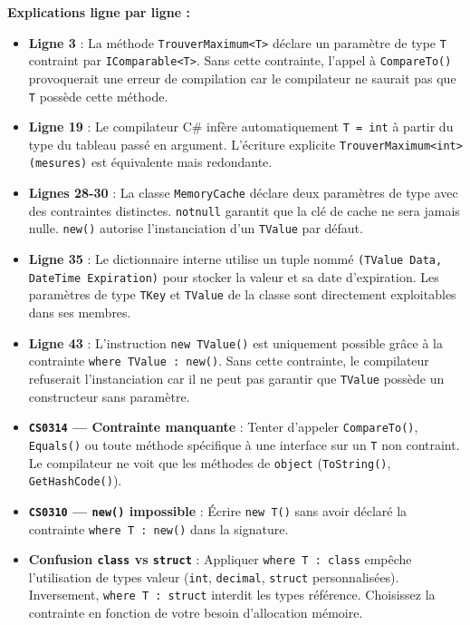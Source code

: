 \textbf{Explications ligne par ligne :}
\begin{itemize}
    \item \textbf{Ligne 3} : La méthode \texttt{TrouverMaximum<T>} déclare un paramètre de type \texttt{T} contraint par \texttt{IComparable<T>}. Sans cette contrainte, l'appel à \texttt{CompareTo()} provoquerait une erreur de compilation car le compilateur ne saurait pas que \texttt{T} possède cette méthode.
    \item \textbf{Ligne 19} : Le compilateur C\# infère automatiquement \texttt{T = int} à partir du type du tableau passé en argument. L'écriture explicite \texttt{TrouverMaximum<int>(mesures)} est équivalente mais redondante.
    \item \textbf{Lignes 28-30} : La classe \texttt{MemoryCache} déclare deux paramètres de type avec des contraintes distinctes. \texttt{notnull} garantit que la clé de cache ne sera jamais nulle. \texttt{new()} autorise l'instanciation d'un \texttt{TValue} par défaut.
    \item \textbf{Ligne 35} : Le dictionnaire interne utilise un tuple nommé \texttt{(TValue Data, DateTime Expiration)} pour stocker la valeur et sa date d'expiration. Les paramètres de type \texttt{TKey} et \texttt{TValue} de la classe sont directement exploitables dans ses membres.
    \item \textbf{Ligne 43} : L'instruction \texttt{new TValue()} est uniquement possible grâce à la contrainte \texttt{where TValue : new()}. Sans cette contrainte, le compilateur refuserait l'instanciation car il ne peut pas garantir que \texttt{TValue} possède un constructeur sans paramètre.
\end{itemize}

\begin{tcolorbox}[colback=white,colframe=keywordcolor,title=\textbf{Pièges courants \& Erreurs de compilation}]
    \begin{itemize}
        \item \textbf{\texttt{CS0314} — Contrainte manquante} : Tenter d'appeler \texttt{CompareTo()}, \texttt{Equals()} ou toute méthode spécifique à une interface sur un \texttt{T} non contraint. Le compilateur ne voit que les méthodes de \texttt{object} (\texttt{ToString()}, \texttt{GetHashCode()}).
        \item \textbf{\texttt{CS0310} — \texttt{new()} impossible} : Écrire \texttt{new T()} sans avoir déclaré la contrainte \texttt{where T : new()} dans la signature.
        \item \textbf{Confusion \texttt{class} vs \texttt{struct}} : Appliquer \texttt{where T : class} empêche l'utilisation de types valeur (\texttt{int}, \texttt{decimal}, \texttt{struct} personnalisées). Inversement, \texttt{where T : struct} interdit les types référence. Choisissez la contrainte en fonction de votre besoin d'allocation mémoire.
    \end{itemize}
\end{tcolorbox}

